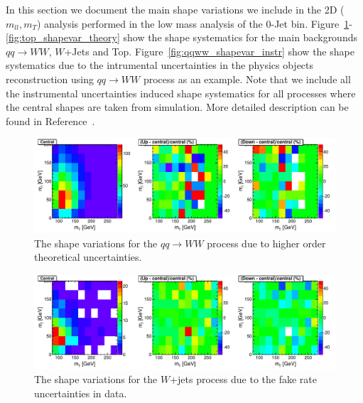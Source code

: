 In this section we document the main shape variations we include in the 
2D ($m_{ll}, m_T$) analysis performed in the low mass analysis of the 0-Jet bin. 
Figure~\ref{fig:qqww_shapevar_theory}-\ref{fig:top_shapevar_theory} 
show the shape systematics for the main backgrounds $qq\to WW$, $W$+Jets and Top. 
Figure~\ref{fig:qqww_shapevar_instr} show the shape systematics due to the 
intrumental uncertainties in the physics objects reconstruction using 
$qq\to WW$ process as an example. Note that we include all the instrumental 
uncertainties induced shape systematics for all processes where the central shapes 
are taken from simulation. More detailed description can be found in Reference~\cite{MVASyst}. 

\begin{figure}[!hbtp]
\centering
\includegraphics[width=1.0\textwidth]{figures/qqWW_WWNLOBounding_2D_mH125_0j_of.pdf}
\caption{ The shape variations for the $qq\to WW$ process due to higher order 
theoretical uncertainties. }
\label{fig:qqww_shapevar_theory}
\end{figure}

\begin{figure}[!hbtp]
\centering
\includegraphics[width=1.0\textwidth]{figures/Wjets_WBounding_2D_mH125_0j_of.pdf}
\caption{ The shape variations for the $W$+jets process due to the fake rate uncertainties in data. }
\label{fig:wjets_shapevar_theory}
\end{figure}


